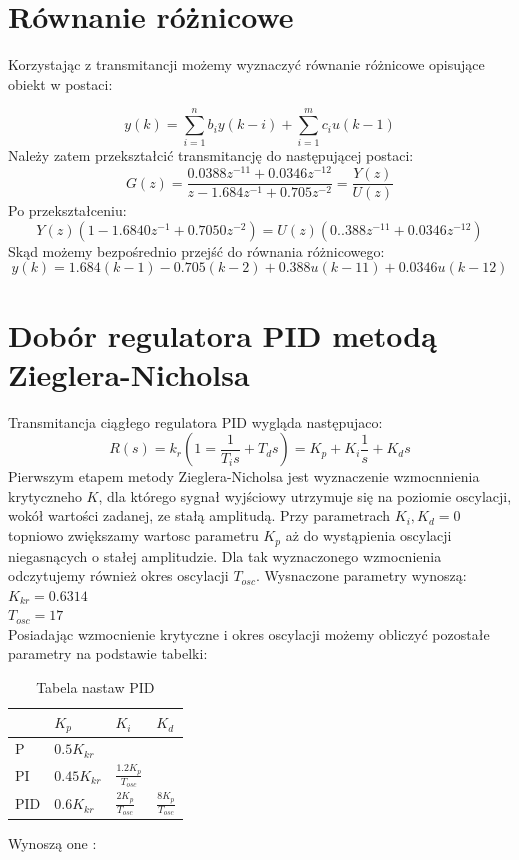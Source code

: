 \documentclass[a4paper, 11pt]{article}
\begin{document}
\section{Równanie różnicowe}
Korzystając z transmitancji możemy wyznaczyć równanie różnicowe opisujące obiekt w postaci: 

$$y(k) = \sum_{i=1}^{n} b_iy(k-i)+ \sum_{i=1}^{m} c_iu(k-1)$$
Należy zatem przekształcić transmitancję do następującej postaci: 
$$G(z) = \frac{0.0388z^{-11}+0.0346z^{-12}}{z-1.684z^{-1}+0.705z^{-2}} = \frac{Y(z)}{U(z)}$$
Po przekształceniu: 
$$Y(z)(1-1.6840z^{-1}+0.7050z^{-2}) = U(z)(0..388z^{-11}+0.0346z^{-12})$$
Skąd możemy bezpośrednio przejść do równania różnicowego: 
$$y(k) = 1.684(k-1) - 0.705(k-2) + 0.388u(k-11) + 0.0346u(k-12)$$


\section{Dobór regulatora PID metodą Zieglera-Nicholsa}
Transmitancja ciągłego regulatora PID wygląda następujaco: 
$$R(s) = k_r(1=\frac{1}{T_is}+T_ds)=K_p + K_i\frac{1}{s}+K_ds$$
Pierwszym etapem metody Zieglera-Nicholsa jest wyznaczenie wzmocnnienia krytyczneho $K$, dla którego sygnał wyjściowy utrzymuje się na poziomie oscylacji, wokół wartości zadanej, ze stałą amplitudą. Przy parametrach $K_i, K_d=0$ topniowo zwiększamy wartosc parametru $K_p$ aż do wystąpienia oscylacji niegasnących o stałej amplitudzie. Dla tak wyznaczonego wzmocnienia odczytujemy również okres oscylacji $T_{osc}$. Wysnaczone parametry wynoszą: \\

$K_{kr} = 0.6314$\\
\indent $T_{osc} = 17$\\

Posiadając wzmocnienie krytyczne i okres oscylacji możemy obliczyć pozostałe parametry na podstawie tabelki: 
\begin{table}[htp]
\centering
\caption{Tabela nastaw PID}
\label{my-label}
\begin{tabular}{|l|l|l|l|}
\hline
    & $K_p$       & $K_i $                & $K_d $              \\
\hline
P   & $0.5K_{kr} $ &                    &                   \\
\hline
PI   & $0.45K_{kr}$ & $\frac{1.2K_p}{T_{osc}}$ &                   \\
\hline
PID & $0.6K_{kr} $ & $\frac{2K_p}{T_{osc}}$   & $\frac{8K_p}{T_{osc}}$ \\
\hline
\end{tabular}
\end{table}
Wynoszą one :\\
\end{document}
